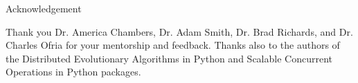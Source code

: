 \begin{block}{Acknowledgement}
{\footnotesize
Thank you Dr. America Chambers,	Dr. Adam Smith, Dr. Brad Richards, and Dr. Charles Ofria for your mentorship and feedback.
Thanks also to the authors of the Distributed Evolutionary Algorithms in Python and Scalable Concurrent Operations in Python packages.\par
}
\end{block}